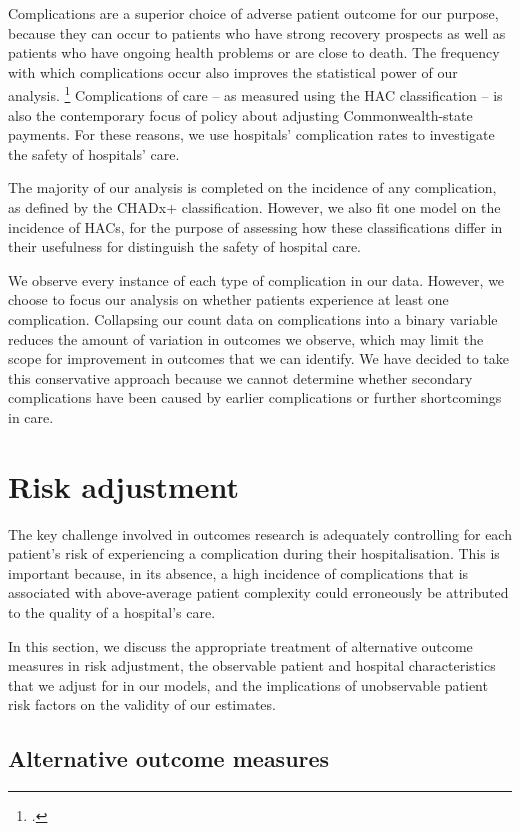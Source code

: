 \documentclass[submission]{grattan}
\begin{document}
Complications are a superior choice of adverse patient outcome for our purpose, because they can occur to patients who have strong recovery prospects as well as patients who have ongoing health problems or are close to death.
The frequency with which complications occur also improves the statistical power of our analysis.%
	\footcite{krumholz2006standards}
Complications of care -- as measured using the HAC classification -- is also the contemporary focus of policy about adjusting Commonwealth-state payments.
For these reasons, we use hospitals' complication rates to investigate the safety of hospitals' care.

The majority of our analysis is completed on the incidence of any complication, as defined by the CHADx+ classification.
However, we also fit one model on the incidence of HACs, for the purpose of assessing how these classifications differ in their usefulness for distinguish the safety of hospital care.

We observe every instance of each type of complication in our data.
However, we choose to focus our analysis on whether patients experience at least one complication.
Collapsing our count data on complications into a binary variable reduces the amount of variation in outcomes we observe, which may limit the scope for improvement in outcomes that we can identify.
We have decided to take this conservative approach because we cannot determine whether secondary complications have been caused by earlier complications or further shortcomings in care.

\section{Risk adjustment}\label{sec:risk-adjustment}

The key challenge involved in outcomes research is adequately controlling for each patient's risk of experiencing a complication during their hospitalisation.
This is important because, in its absence, a high incidence of complications that is associated with above-average patient complexity could erroneously be attributed to the quality of a hospital's care.

In this section, we discuss the appropriate treatment of alternative outcome measures in risk adjustment, the observable patient and hospital characteristics that we adjust for in our models, and the implications of unobservable patient risk factors on the validity of our estimates.

\subsection{Alternative outcome measures}\label{subsec:alternative-outcome-measures}
\end{document}
